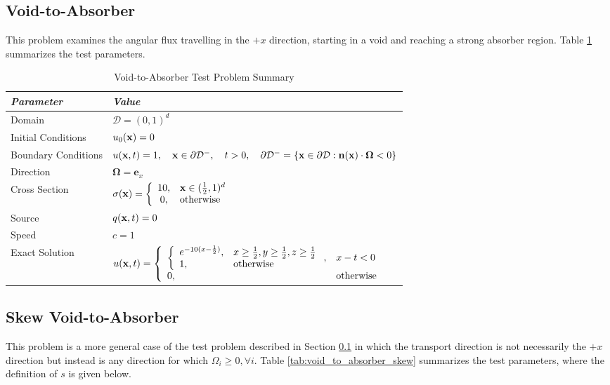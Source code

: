 \subsection{Void-to-Absorber}\label{sec:void_to_absorber}
This problem examines the angular flux travelling in the $+x$ direction,
starting in a void and reaching a strong absorber region.
Table \ref{tab:void_to_absorber} summarizes the test parameters.

\begin{table}[h]\caption{Void-to-Absorber Test Problem Summary}
\label{tab:void_to_absorber}
\centering
\begin{tabular}{l l}\toprule
\emph{Parameter} & \emph{Value}\\\midrule
Domain & $\mathcal{D} = (0,1)^d$\\
Initial Conditions & $u_0(\mathbf{x})=0$\\
Boundary Conditions & $u(\mathbf{x},t)=1,\quad \mathbf{x}\in\partial\mathcal{D}^-,\quad t>0,
   \quad\partial\mathcal{D}^-=\{\mathbf{x}\in\partial\mathcal{D}:\mathbf{n}(\mathbf{x})
   \cdot\mathbf{\Omega}<0\}$\\
Direction & $\mathbf{\Omega} = \mathbf{e}_x$\\
Cross Section & $\sigma(\mathbf{x})=\left\{\begin{array}{c l}
   10, & \mathbf{x}\in(\frac{1}{2},1)^d\\
   0,  & \mbox{otherwise}\end{array}\right.$\\
Source & $q(\mathbf{x},t)=0$\\
Speed & $c=1$\\
Exact Solution & $u(\mathbf{x},t)=\left\{\begin{array}{l l}
   \left\{\begin{array}{l l}
      e^{-10(x-\frac{1}{2})}, & x\ge\frac{1}{2}, y\ge\frac{1}{2}, z\ge\frac{1}{2}\\
      1,                      & \mbox{otherwise}
   \end{array}\right., & x-t<0\\
   0, & \mbox{otherwise}
   \end{array}\right.$ \\
\bottomrule\end{tabular}
\end{table}
\subsection{Skew Void-to-Absorber}\label{sec:skew_void_to_absorber}
This problem is a more general case of the test problem described in
Section \ref{sec:void_to_absorber} in which the transport direction is
not necessarily the $+x$ direction but instead is any direction for which
$\Omega_i\ge 0,\forall i$.
Table \ref{tab:void_to_absorber_skew} summarizes the test parameters,
where the definition of $s$ is given below.

